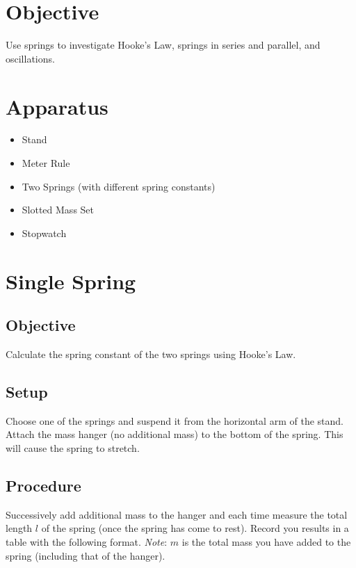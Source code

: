 \section*{Objective}

    Use springs to investigate Hooke's Law, springs in series and parallel, and oscillations.

\section*{Apparatus}

    \begin{itemize}

        \item Stand
        \item Meter Rule
        \item Two Springs (with different spring constants)
        \item Slotted Mass Set
        \item Stopwatch

    \end{itemize}

\setcounter{section}{0}
\section{Single Spring}\label{single_spring}

    \subsection*{Objective}

        Calculate the spring constant of the two springs using Hooke's Law.

    \subsection*{Setup}

        Choose one of the springs and suspend it from the horizontal arm of the stand. Attach the mass hanger (no additional mass) to the bottom of the spring. This will cause the spring to stretch.

    \subsection*{Procedure}

        Successively add additional mass to the hanger and each time measure the total length $l$ of the spring (once the spring has come to rest). Record you results in a table with the following format. \textit{Note}: $m$ is the total mass you have added to the spring (including that of the hanger).

